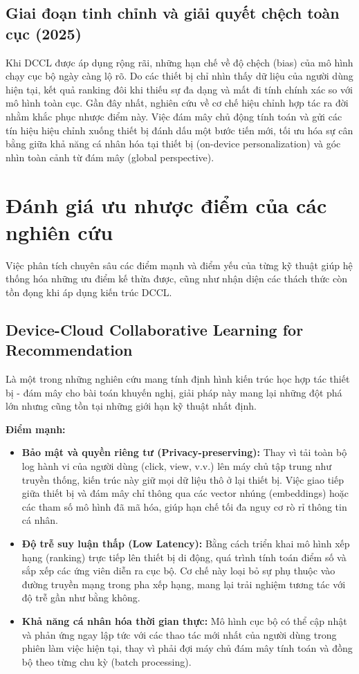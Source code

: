 \subsection{Giai đoạn tinh chỉnh và giải quyết chệch toàn cục (2025)}
Khi DCCL được áp dụng rộng rãi, những hạn chế về độ chệch (bias) của mô hình chạy cục bộ ngày càng lộ rõ. Do các thiết bị chỉ nhìn thấy dữ liệu của người dùng hiện tại, kết quả ranking đôi khi thiếu sự đa dạng và mất đi tính chính xác so với mô hình toàn cục. Gần đây nhất, nghiên cứu về cơ chế hiệu chỉnh hợp tác \cite{wang2025correction} ra đời nhằm khắc phục nhược điểm này. Việc đám mây chủ động tính toán và gửi các tín hiệu hiệu chỉnh xuống thiết bị đánh dấu một bước tiến mới, tối ưu hóa sự cân bằng giữa khả năng cá nhân hóa tại thiết bị (on-device personalization) và góc nhìn toàn cảnh từ đám mây (global perspective).

\section{Đánh giá ưu nhược điểm của các nghiên cứu}

Việc phân tích chuyên sâu các điểm mạnh và điểm yếu của từng kỹ thuật giúp hệ thống hóa những ưu điểm kế thừa được, cũng như nhận diện các thách thức còn tồn đọng khi áp dụng kiến trúc DCCL.

\subsection{Device-Cloud Collaborative Learning for Recommendation \cite{yao2021device}}

Là một trong những nghiên cứu mang tính định hình kiến trúc học hợp tác thiết bị - đám mây cho bài toán khuyến nghị, giải pháp này mang lại những đột phá lớn nhưng cũng tồn tại những giới hạn kỹ thuật nhất định.

\textbf{Điểm mạnh:}
\begin{itemize}
    \item \textbf{Bảo mật và quyền riêng tư (Privacy-preserving):} Thay vì tải toàn bộ log hành vi của người dùng (click, view, v.v.) lên máy chủ tập trung như truyền thống, kiến trúc này giữ mọi dữ liệu thô ở lại thiết bị. Việc giao tiếp giữa thiết bị và đám mây chỉ thông qua các vector nhúng (embeddings) hoặc các tham số mô hình đã mã hóa, giúp hạn chế tối đa nguy cơ rò rỉ thông tin cá nhân.
    \item \textbf{Độ trễ suy luận thấp (Low Latency):} Bằng cách triển khai mô hình xếp hạng (ranking) trực tiếp lên thiết bị di động, quá trình tính toán điểm số và sắp xếp các ứng viên diễn ra cục bộ. Cơ chế này loại bỏ sự phụ thuộc vào đường truyền mạng trong pha xếp hạng, mang lại trải nghiệm tương tác với độ trễ gần như bằng không.
    \item \textbf{Khả năng cá nhân hóa thời gian thực:} Mô hình cục bộ có thể cập nhật và phản ứng ngay lập tức với các thao tác mới nhất của người dùng trong phiên làm việc hiện tại, thay vì phải đợi máy chủ đám mây tính toán và đồng bộ theo từng chu kỳ (batch processing).
\end{itemize}


